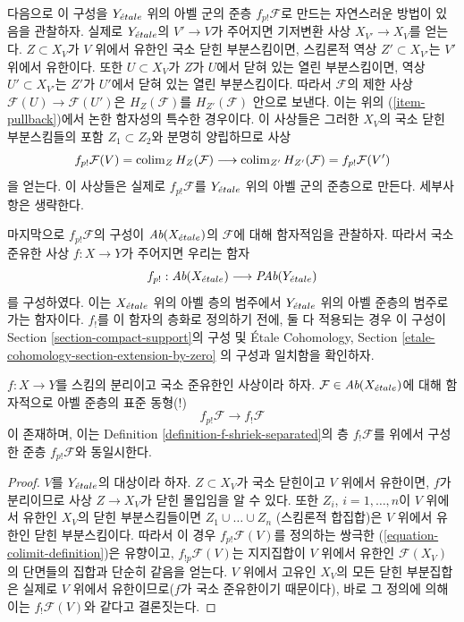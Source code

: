 \medskip\noindent
다음으로 이 구성을 $Y_{\acute{e}tale}$ 위의 아벨 군의 준층
$f_{p!}\mathcal{F}$로 만드는 자연스러운 방법이 있음을 관찰하자.
실제로 $Y_{\acute{e}tale}$의 $V' \to V$가 주어지면 기저변환 사상
$X_{V'} \to X_V$를 얻는다. $Z \subset X_V$가 $V$ 위에서 유한인
국소 닫힌 부분스킴이면, 스킴론적 역상 $Z' \subset X_{V'}$는
$V'$ 위에서 유한이다. 또한 $U \subset X_V$가 $Z$가 $U$에서
닫혀 있는 열린 부분스킴이면, 역상 $U' \subset X_{V'}$는 $Z'$가
$U'$에서 닫혀 있는 열린 부분스킴이다. 따라서 $\mathcal{F}$의
제한 사상 $\mathcal{F}(U) \to \mathcal{F}(U')$은
$H_Z(\mathcal{F})$를 $H_{Z'}(\mathcal{F})$ 안으로 보낸다. 이는
위의 (\ref{item-pullback})에서 논한 함자성의 특수한 경우이다.
이 사상들은 그러한 $X_V$의 국소 닫힌 부분스킴들의 포함
$Z_1 \subset Z_2$와 분명히 양립하므로 사상
$$
f_{p!}\mathcal{F}(V) = \mathop{\mathrm{colim}}\nolimits_Z H_Z(\mathcal{F})
\longrightarrow
\mathop{\mathrm{colim}}\nolimits_{Z'} H_{Z'}(\mathcal{F}) =
f_{p!}\mathcal{F}(V')
$$
을 얻는다. 이 사상들은 실제로 $f_{p!}\mathcal{F}$를
$Y_{\acute{e}tale}$ 위의 아벨 군의 준층으로 만든다. 세부사항은 생략한다.

\medskip\noindent
마지막으로 $f_{p!}\mathcal{F}$의 구성이
$\textit{Ab}(X_{\acute{e}tale})$의 $\mathcal{F}$에 대해 함자적임을 관찰하자.
따라서 국소 준유한 사상 $f : X \to Y$가 주어지면 우리는
함자
$$
f_{p!} :
\textit{Ab}(X_{\acute{e}tale})
\longrightarrow
\textit{PAb}(Y_{\acute{e}tale})
$$
를 구성하였다. 이는 $X_{\acute{e}tale}$ 위의 아벨 층의 범주에서
$Y_{\acute{e}tale}$ 위의 아벨 준층의 범주로 가는 함자이다. $f_!$를
이 함자의 층화로 정의하기 전에, 둘 다 적용되는 경우 이 구성이
Section \ref{section-compact-support}의 구성 및
\'Etale Cohomology, Section \ref{etale-cohomology-section-extension-by-zero}
의 구성과 일치함을 확인하자.

\begin{lemma}
\label{lemma-finite-support-f-shriek-separated}
$f : X \to Y$를 스킴의 분리이고 국소 준유한인 사상이라 하자.
$\mathcal{F} \in \textit{Ab}(X_{\acute{e}tale})$에 대해 함자적으로 아벨 준층의
표준 동형(!)
$$
f_{p!}\mathcal{F} \longrightarrow f_!\mathcal{F}
$$
이 존재하며, 이는 Definition \ref{definition-f-shriek-separated}의 층
$f_!\mathcal{F}$를 위에서 구성한 준층 $f_{p!}\mathcal{F}$와 동일시한다.
\end{lemma}

\begin{proof}
$V$를 $Y_{\acute{e}tale}$의 대상이라 하자. $Z \subset X_V$가 국소 닫힌이고
$V$ 위에서 유한이면, $f$가 분리이므로 사상 $Z \to X_V$가
닫힌 몰입임을 알 수 있다. 또한 $Z_i$, $i = 1, \ldots, n$이
$V$ 위에서 유한인 $X_V$의 닫힌 부분스킴들이면
$Z_1 \cup \ldots \cup Z_n$ (스킴론적 합집합)은 $V$ 위에서 유한인
닫힌 부분스킴이다. 따라서 이 경우 $f_{p!}\mathcal{F}(V)$를 정의하는
쌍극한 (\ref{equation-colimit-definition})은 유향이고,
$f_{!p}\mathcal{F}(V)$는 지지집합이 $V$ 위에서 유한인
$\mathcal{F}(X_V)$의 단면들의 집합과 단순히 같음을 얻는다.
$V$ 위에서 고유인 $X_V$의 모든 닫힌 부분집합은 실제로 $V$ 위에서
유한이므로($f$가 국소 준유한이기 때문이다), 바로 그 정의에 의해
이는 $f_!\mathcal{F}(V)$와 같다고 결론짓는다.
\end{proof}

